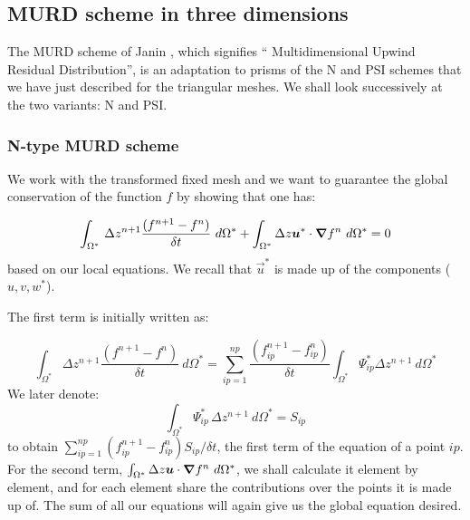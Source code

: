 \subsection{\label{schema murd en dimension 3}MURD scheme in three dimensions%
%
}

The MURD scheme of Janin \cite{janin95}, which signifies \textquotedblleft
Multidimensional Upwind Residual Distribution\textquotedblright, is an
adaptation to prisms of the N and PSI schemes that we have just described for
the triangular meshes. We shall look successively at the two variants: N and PSI.

\subsubsection{N-type MURD scheme}

We work with the transformed fixed mesh and we want to guarantee the global
conservation of the function $f$ by showing that one has:%

\begin{equation}
\int\nolimits_{\Omega^{\ast}}\,\Delta z^{n+1}\dfrac{(f^{n+1}-f^{n})}{\delta t}~
d\Omega^{\ast}+\int\nolimits_{\Omega^{\ast}}\Delta z\bm{u}^{\ast}
\cdot\bm{\nabla} f^{n}~d\Omega^{\ast}=0
\end{equation}
based on our local equations. We recall that $\vec{u}^{\ast}$ is
made up of the components ($u,v,w^{\ast}$).

The first term is initially written as:%

\begin{equation}
\int\nolimits_{\Omega^{\ast}}\Delta z^{n+1}\dfrac{(f^{n+1}-f^{n})}{\delta
t}~d\Omega^{\ast}=\sum\limits_{ip=1}^{np}\dfrac{(f_{ip}^{n+1}-f_{ip}^{n}%
)}{\delta t}\int\nolimits_{\Omega^{\ast}}\Psi_{ip}^{\ast}\Delta
z^{n+1}~d\Omega^{\ast}
\end{equation}
We later denote:
\begin{equation}
\int\nolimits_{\Omega^{\ast}}\Psi_{ip}^{\ast}\,\Delta z^{n+1}~d\Omega^{\ast
}=S_{ip}%
\end{equation}
to obtain
$\sum\nolimits_{ip=1}^{np}(f_{ip}^{n+1}-f_{ip}^{n})S_{ip}/\delta t$,
the first term of the equation of a point $ip$.
For the second term, $\int\nolimits_{\Omega^{\ast}}\Delta z\bm{u}
\cdot\bm{\nabla} f^{n}~d\Omega^{\ast}$, we
shall calculate it element by element, and for each element share the
contributions over the points it is made up of. The sum of all our equations
will again give us the global equation desired.

